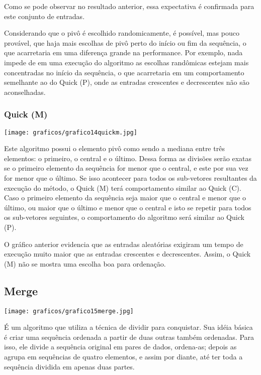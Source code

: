 \documentclass[12pt,a4paper]{article}
\begin{document}
Como se pode observar no resultado anterior, essa expectativa é confirmada para este conjunto de entradas.

Considerando que o pivô é escolhido randomicamente, é possível, mas pouco provável, que haja mais escolhas de pivô perto do início ou fim da sequência, o que acarretaria em uma diferença grande na performance. Por exemplo, nada impede de em uma execução do algoritmo as escolhas randômicas estejam mais concentradas no início da sequência, o que acarretaria em um comportamento semelhante ao do Quick (P), onde as entradas crescentes e decrescentes não são aconselhadas.






\subsubsection{Quick (M)}
\begin{center}
\texttt{[image: graficos/grafico14quickm.jpg]}
\end{center}

Este algoritmo possui o elemento pivô como sendo a mediana entre três elementos: o primeiro, o central e o último. Dessa forma as divisões serão exatas se o primeiro elemento da sequência for menor que o central, e este por sua vez for menor que o último. Se isso acontecer para todos os sub-vetores resultantes da execução do método, o Quick (M) terá comportamento similar ao Quick (C). Caso o primeiro elemento da sequência seja maior que o central e menor que o último, ou maior que o último e menor que o central e isto se repetir para todos os sub-vetores seguintes, o comportamento do algoritmo será similar ao Quick (P).  

O gráfico anterior evidencia que as entradas aleatórias exigiram um tempo de execução muito maior que as entradas crescentes e decrescentes. Assim, o Quick (M) não se mostra uma escolha boa para ordenação.






\subsection{Merge}
\begin{center}
\texttt{[image: graficos/grafico15merge.jpg]}
\end{center}

É um algoritmo que utiliza a técnica de dividir para conquistar. Sua idéia básica é criar uma sequência ordenada a partir de duas outras também ordenadas. Para isso, ele divide a sequência original em pares de dados, ordena-as; depois as agrupa em sequências de quatro elementos, e assim por diante, até ter toda a sequência dividida em apenas duas partes.
\end{document}
